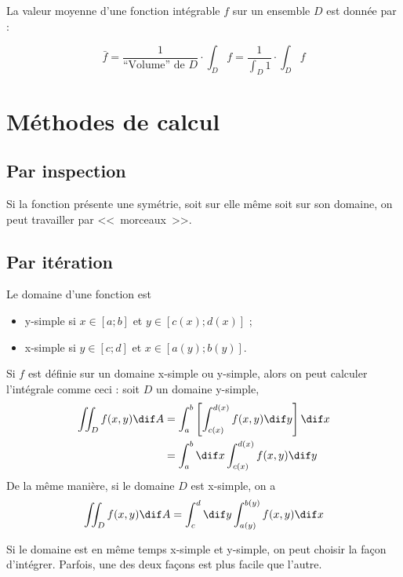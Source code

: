 \begin{mytheo}
	La valeur moyenne d'une fonction intégrable $f$ sur un ensemble $D$ est donnée par :

	\[ \bar{f} = \frac{1}{\text{``Volume'' de } D} \cdot \int_D f = \frac{1}{\int_D 1} \cdot \int_D f\]
\end{mytheo}

\section{Méthodes de calcul}

\subsection{Par inspection} Si la fonction présente une symétrie, soit sur elle même soit sur son domaine, on peut travailler par <<~morceaux~>>.

\subsection{Par itération}

\begin{mydef}
	Le domaine d'une fonction est
	\begin{itemize}
		\item y-simple si $x \in [a;b]$ et $y \in [c(x);d(x)]$ ;
		\item x-simple si $y \in [c;d]$ et $x \in [a(y);b(y)]$.
	\end{itemize}
\end{mydef}

\begin{myprop} Si $f$ est définie sur un domaine x-simple ou y-simple, alors on peut calculer l'intégrale comme ceci : soit $D$ un domaine y-simple,
	\begin{align*} \iint_D f(x,y)\dif A & = \int_a^b \left[ \int_{c(x)}^{d(x)} f(x,y) \dif y \right] \dif x \\
		& = \int_a^b \dif x \int_{c(x)}^{d(x)} f(x,y) \dif y
	\end{align*}
	De la même manière, si le domaine $D$ est x-simple, on a
	\[ \iint_D f(x,y)\dif A  = \int_c^d \dif y \int_{a(y)}^{b(y)} f(x,y) \dif x \]
\end{myprop}

\begin{myrem}
	Si le domaine est en même temps x-simple et y-simple, on peut choisir la façon d'intégrer.
	Parfois, une des deux façons est plus facile que l'autre.
\end{myrem}

